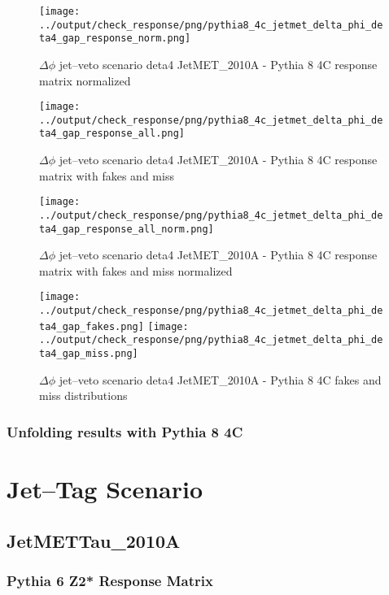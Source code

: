 \documentclass[11pt]{book}
\begin{document}
\begin{figure}[ht]
\centering
\texttt{[image: ../output/check\_response/png/pythia8\_4c\_jetmet\_delta\_phi\_deta4\_gap\_response\_norm.png]}
\caption{$\Delta\phi$ jet--veto scenario deta4 JetMET\_2010A - Pythia 8 4C response matrix normalized}
\label{p8_jetmet_delta_phi_deta4_gap_response_norm}
\end{figure}

\begin{figure}[ht]
\centering
\texttt{[image: ../output/check\_response/png/pythia8\_4c\_jetmet\_delta\_phi\_deta4\_gap\_response\_all.png]}
\caption{$\Delta\phi$ jet--veto scenario deta4 JetMET\_2010A - Pythia 8 4C response matrix with fakes and miss}
\label{p8_jetmet_delta_phi_deta4_gap_response_all}
\end{figure}

\begin{figure}[ht]
\centering
\texttt{[image: ../output/check\_response/png/pythia8\_4c\_jetmet\_delta\_phi\_deta4\_gap\_response\_all\_norm.png]}
\caption{$\Delta\phi$ jet--veto scenario deta4 JetMET\_2010A - Pythia 8 4C response matrix with fakes and miss normalized}
\label{p8_jetmet_delta_phi_deta4_gap_response_all_norm}
\end{figure}

\begin{figure}[ht]
\centering
\texttt{[image: ../output/check\_response/png/pythia8\_4c\_jetmet\_delta\_phi\_deta4\_gap\_fakes.png]}
\texttt{[image: ../output/check\_response/png/pythia8\_4c\_jetmet\_delta\_phi\_deta4\_gap\_miss.png]}
\caption{$\Delta\phi$ jet--veto scenario deta4 JetMET\_2010A - Pythia 8 4C fakes and miss distributions}
\label{p8_jetmet_delta_phi_deta4_gap_fakesmiss}
\end{figure}


\clearpage
\subsection{Unfolding results with Pythia 8 4C}



\newpage
\chapter{Jet--Tag Scenario}
\section{JetMETTau\_2010A}
\subsection{Pythia 6 Z2* Response Matrix}
\end{document}

